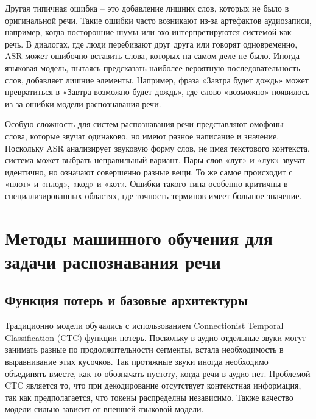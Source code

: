 Другая типичная ошибка -- это добавление лишних слов, которых не было в оригинальной речи.
Такие ошибки часто возникают из-за артефактов аудиозаписи, например, когда посторонние шумы или эхо интерпретируются системой как речь.
В диалогах, где люди перебивают друг друга или говорят одновременно, ASR может ошибочно вставить слова, которых на самом деле не было.
Иногда языковая модель, пытаясь предсказать наиболее вероятную последовательность слов, добавляет лишние элементы.
Например, фраза «Завтра будет дождь» может превратиться в «Завтра возможно будет дождь», где слово «возможно» появилось из-за ошибки модели распознавания речи.

Особую сложность для систем распознавания речи представляют омофоны -- слова, которые звучат одинаково, но имеют разное написание и значение.
Поскольку ASR анализирует звуковую форму слов, не имея текстового контекста, система может выбрать неправильный вариант.
Пары слов «луг» и «лук» звучат идентично, но означают совершенно разные вещи.
То же самое происходит с «плот» и «плод», «код» и «кот».
Ошибки такого типа особенно критичны в специализированных областях, где точность терминов имеет большое значение.

\section{Методы машинного обучения для задачи распознавания речи}

\subsection{Функция потерь и базовые архитектуры}

Традиционно модели обучались с использованием Connectionist Temporal Classification (CTC) функции потерь\cite{graves2006connectionist}.
Поскольку в аудио отдельные звуки могут занимать разные по продолжительности сегменты, встала необходимость в выравнивание этих кусочков.
Так протяжные звуки иногда необходимо объединять вместе, как-то обозначать пустоту, когда речи в аудио нет.
Проблемой CTC является то, что при декодирование отсутствует контекстная информация, так как предполагается, что токены распределны независимо.
Также качество модели сильно зависит от внешней языковой модели.

